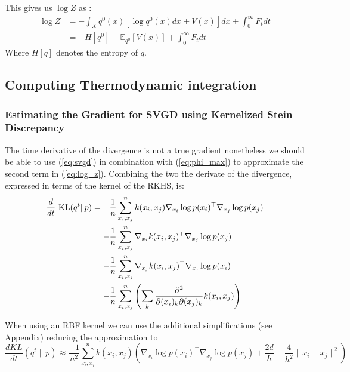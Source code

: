 \documentclass{article}
\begin{document}
    This gives us $\log Z$ as :
    \begin{align}
    \label{eq:log_z}
    \log Z &= - \int_X q^0(x) [\log q^0(x) dx +  V(x)] dx 
            + \int_0^\infty F_t dt \\
           &= -H[q^0] - \mathbb{E}_{q^0}[V(x)] +\int_0^\infty F_t dt 
    \end{align}
    Where $H[q]$ denotes the entropy of $q$.


    \newpage

\subsection{Computing Thermodynamic integration}
\subsubsection{Estimating the Gradient for SVGD using Kernelized Stein Discrepancy}
    The time derivative of the \KL divergence is not a true gradient nonetheless we should be able to use
    (\ref{eq:svgd}) in combination with (\ref{eq:phi_max}) to approximate the second term in (\ref{eq:log_z}).
    Combining the two the derivate of the \KL divergence, expressed in terms of the kernel of the RKHS, is:
    \begin{align}
        \label{eq:F_approximation}
        \frac{d}{dt}\ \textrm{KL}( q^t \| p ) = -& \frac{1}{n}\sum_{x_i,x_j}^n  k(x_i,x_j) \nabla_{x_i} \log p(x_i)^\top \nabla_{x_j} \log p(x_j)  \\ 
        -& \frac{1}{n}\sum_{x_i,x_j}^n  \nabla_{x_i} k(x_i,x_j)^\top \nabla_{x_j} \log p(x_j)  \\ 
        -& \frac{1}{n}\sum_{x_i,x_j}^n  \nabla_{x_j} k(x_i,x_j)^\top \nabla_{x_i} \log p(x_i)  \\ 
        -& \frac{1}{n}\sum_{x_i,x_j}^n \left( \sum_k \frac{ \partial^2 }{ \partial (x_i)_k \partial (x_j)_k } 
            k(x_i,x_j) \right)
    \end{align}

    When using an RBF kernel we can use the additional simplifications (see Appendix) reducing the approximation to
    \small
    \begin{equation}
        \frac{dKL}{dt}( q^t \| p ) \approx \frac{-1}{n^2}\sum_{x_i,x_j}^n  
            k(x_i,x_j) \left( \nabla_{x_i} \log p(x_i)^\top \nabla_{x_j} \log p(x_j)  
                + \frac{2d}{h} - \frac{4}{h^2} \|x_i - x_j\|^2 \right)
    \end{equation} 
    \normalsize
\end{document}
